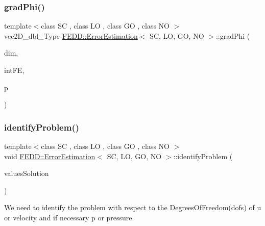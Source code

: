 \subsubsection{\texorpdfstring{grad\+Phi()}{gradPhi()}}
{\footnotesize\ttfamily template$<$class SC , class LO , class GO , class NO $>$ \\
vec2\+D\+\_\+dbl\+\_\+\+Type \hyperlink{classFEDD_1_1ErrorEstimation}{F\+E\+D\+D\+::\+Error\+Estimation}$<$ SC, LO, GO, NO $>$\+::grad\+Phi (\begin{DoxyParamCaption}\item[{int}]{dim,  }\item[{int}]{int\+FE,  }\item[{vec\+\_\+dbl\+\_\+\+Type \&}]{p }\end{DoxyParamCaption})}

\mbox{\label{classFEDD_1_1ErrorEstimation_a590f7b920955acbc096854c5de775c58}} 
\subsubsection{\texorpdfstring{identify\+Problem()}{identifyProblem()}}
{\footnotesize\ttfamily template$<$class SC , class LO , class GO , class NO $>$ \\
void \hyperlink{classFEDD_1_1ErrorEstimation}{F\+E\+D\+D\+::\+Error\+Estimation}$<$ SC, LO, GO, NO $>$\+::identify\+Problem (\begin{DoxyParamCaption}\item[{\hyperlink{classFEDD_1_1ErrorEstimation_a8a53d809dfcf71abaffe46f85e6b4aa1}{Block\+Multi\+Vector\+Const\+Ptr\+\_\+\+Type}}]{values\+Solution }\end{DoxyParamCaption})}



We need to identify the problem with respect to the Degrees\+Of\+Freedom(dofs) of u or velocity and if necessary p or pressure. 

\mbox{\label{classFEDD_1_1ErrorEstimation_afda1d9f1ed233fd231cd68e74a3dfb56}} 
